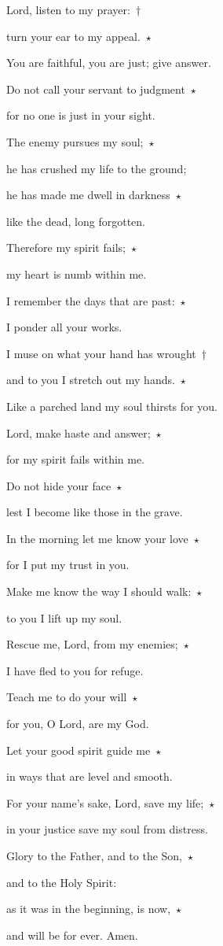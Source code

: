 \noindent Lord, listen to my prayer:~†~\nopagebreak

turn your ear to my appeal.~$\star$~\nopagebreak

You are faithful, you are just; give answer.

\noindent Do not call your servant to judgment~$\star$~\nopagebreak

for no one is just in your sight.

\noindent The enemy pursues my soul;~$\star$~\nopagebreak

he has crushed my life to the ground;

\noindent he has made me dwell in darkness~$\star$~\nopagebreak

like the dead, long forgotten.

\noindent Therefore my spirit fails;~$\star$~\nopagebreak

my heart is numb within me.

\noindent I remember the days that are past:~$\star$~\nopagebreak

I ponder all your works.

\noindent I muse on what your hand has wrought~†~\nopagebreak

and to you I stretch out my hands.~$\star$~\nopagebreak

Like a parched land my soul thirsts for you.

\noindent Lord, make haste and answer;~$\star$~\nopagebreak

for my spirit fails within me.

\noindent Do not hide your face~$\star$~\nopagebreak

lest I become like those in the grave.

\noindent In the morning let me know your love~$\star$~\nopagebreak

for I put my trust in you.

\noindent Make me know the way I should walk:~$\star$~\nopagebreak

to you I lift up my soul.

\noindent Rescue me, Lord, from my enemies;~$\star$~\nopagebreak

I have fled to you for refuge.

\noindent Teach me to do your will~$\star$~\nopagebreak

for you, O Lord, are my God.

\noindent Let your good spirit guide me~$\star$~\nopagebreak

in ways that are level and smooth.

\noindent For your name’s sake, Lord, save my life;~$\star$~\nopagebreak

in your justice save my soul from distress.

\noindent Glory to the Father, and to the Son,~$\star$~\nopagebreak

and to the Holy Spirit:

\noindent as it was in the beginning, is now,~$\star$~\nopagebreak

and will be for ever. Amen.
